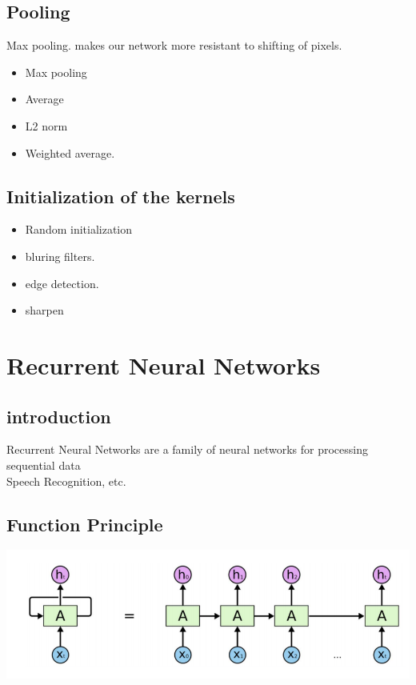 \documentclass[a4paper,10pt,titlepage]{report}
\begin{document}
\subsection{Pooling}
Max pooling. makes our network more resistant to shifting of pixels.\\

\begin{itemize}
\item Max pooling
\item Average
\item L2 norm
\item Weighted average.
\end{itemize}
\subsection{Initialization of the kernels}

\begin{itemize}
\item Random initialization
\item bluring filters.
\item edge detection.
\item sharpen

\end{itemize}

\newpage
\section{Recurrent Neural Networks}
\subsection{introduction}
Recurrent Neural Networks are a family of neural networks for processing sequential data \\

Speech Recognition, etc.

\subsection{Function Principle}

\includegraphics[scale=0.1]{RNN_unrolled.png}
\end{document}
